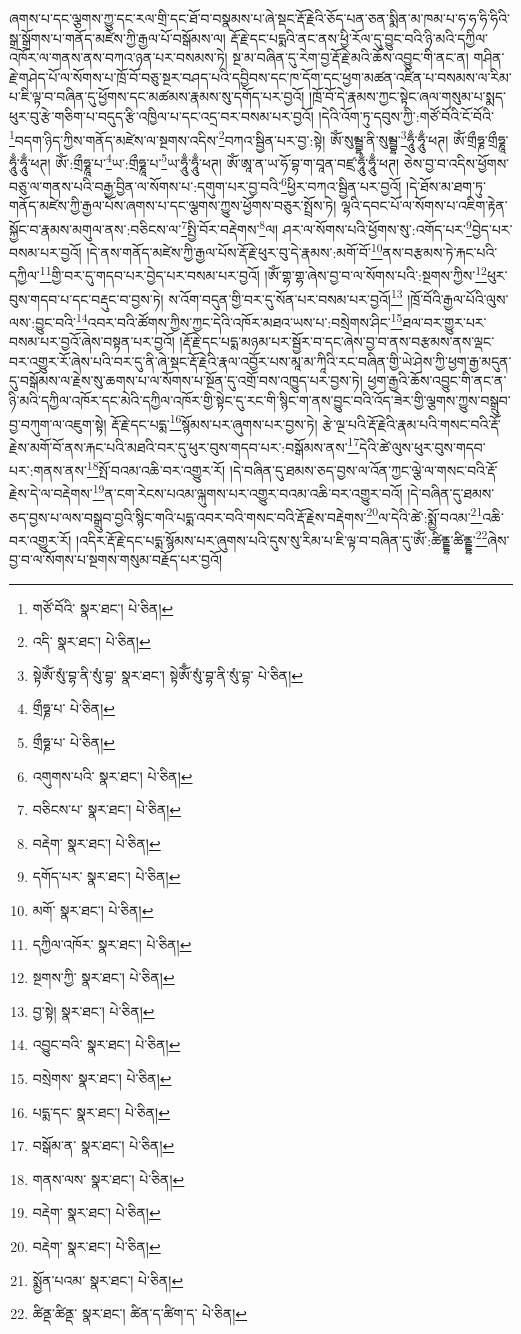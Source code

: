 ཞགས་པ་དང་ལྕགས་ཀྱུ་དང་རལ་གྲི་དང་ཐོ་བ་བསྣམས་པ་ཞེ་སྡང་རྡོ་རྗེའི་ཅོད་པན་ཅན་སྨིན་མ་ཁམ་པ་ཧ་ཧ་ཧི་ཧིའི་སྒྲ་སྒྲོགས་པ་གནོད་མཛེས་ཀྱི་རྒྱལ་པོ་བསྒོམས་ལ། རྡོ་རྗེ་དང་པདྨའི་ནང་ནས་ཕྱི་རོལ་དུ་བྱུང་བའི་ཉི་མའི་དཀྱིལ་འཁོར་ལ་གནས་ནས་བཀའ་ཉན་པར་བསམས་ཏེ། སྔ་མ་བཞིན་དུ་རེག་བྱ་རྡོ་རྗེ་མའི་ཆོས་འབྱུང་གི་ནང་ན། གཤིན་རྗེ་གཤེད་པོ་ལ་སོགས་པ་ཁྲོ་བོ་བཅུ་སྔར་བཤད་པའི་དབྱིབས་དང་ཁ་དོག་དང་ཕྱག་མཚན་འཛིན་པ་བསམས་ལ་རིམ་པ་ཇི་ལྟ་བ་བཞིན་དུ་ཕྱོགས་དང་མཚམས་རྣམས་སུ་དགོད་པར་བྱའོ། །ཁྲོ་བོ་དེ་རྣམས་ཀྱང་སྟེང་ཞལ་གསུམ་པ་སྨད་ཕུར་བུ་རྩེ་གཅིག་པ་བདུད་རྩི་འཁྱིལ་པ་དང་འདྲ་བར་བསམ་པར་བྱའོ། །དེའི་འོག་ཏུ་དབུས་ཀྱི་:གཙོ་བོའི་ངོ་བོའི་\footnote{གཙོ་བོའི་  སྣར་ཐང་།  པེ་ཅིན། }བདག་ཉིད་ཀྱིས་གནོད་མཛེས་ལ་སྔགས་འདིས་\footnote{འདི་  སྣར་ཐང་།  པེ་ཅིན། }བཀའ་སྦྱིན་པར་བྱ་:སྟེ། ཨོཾ་སུམྦྷ་ནི་སུམྦྷ་\footnote{སྟེཨོཾ་སུཾ་བྷ་ནི་སུཾ་བྷ་  སྣར་ཐང་། སྟེཨོྃ་སུཾ་བྷ་ནི་སུཾ་བྷ་  པེ་ཅིན། }ཧཱུྃ་ཧཱུྃ་ཕཊ། ཨོཾ་གྲྀཧྞ་གྲྀཧྞཱ་ཧཱུྃ་ཧཱུྃ་ཕཊ། ཨོཾ་:གྲྀཧྞཱ་པ་\footnote{གྲྀཧྞ་པ་  པེ་ཅིན། }ཡ་:གྲྀཧྞཱ་པ་\footnote{གྲྀཧྞ་པ་  པེ་ཅིན། }ཡ་ཧཱུྃ་ཧཱུྃ་ཕཊ། ཨོཾ་ཨཱ་ན་ཡ་ཧོ་བྷ་ག་བཱན་བཛྲ་ཧཱུྃ་ཧཱུྃ་ཕཊ། ཅེས་བྱ་བ་འདིས་ཕྱོགས་བཅུ་ལ་གནས་པའི་བརྒྱ་བྱིན་ལ་སོགས་པ་:དགུག་པར་བྱ་བའི་\footnote{འགུགས་པའི་  སྣར་ཐང་།  པེ་ཅིན། }ཕྱིར་བཀའ་སྦྱིན་པར་བྱའོ། །དེ་ཐོས་མ་ཐག་ཏུ་གནོད་མཛེས་ཀྱི་རྒྱལ་པོས་ཞགས་པ་དང་ལྕགས་ཀྱུས་ཕྱོགས་བཅུར་སྤྲོས་ཏེ། ལྷའི་དབང་པོ་ལ་སོགས་པ་འཇིག་རྟེན་སྐྱོང་བ་རྣམས་མགུལ་ནས་:བཅིངས་ལ་\footnote{བཅིངས་པ་  སྣར་ཐང་།  པེ་ཅིན། }སྤྱི་བོར་བརྡེགས་\footnote{བརྡེག་  སྣར་ཐང་།  པེ་ཅིན། }ལ། ཤར་ལ་སོགས་པའི་ཕྱོགས་སུ་:འགོད་པར་\footnote{དགོད་པར་  སྣར་ཐང་།  པེ་ཅིན། }བྱེད་པར་བསམ་པར་བྱའོ། །དེ་ནས་གནོད་མཛེས་ཀྱི་རྒྱལ་པོས་རྡོ་རྗེ་ཕུར་བུ་དེ་རྣམས་:མགོ་བོ་\footnote{མགོ་  སྣར་ཐང་།  པེ་ཅིན། }ནས་བརྩམས་ཏེ་རྐང་པའི་དཀྱིལ་\footnote{དཀྱིལ་འཁོར་  སྣར་ཐང་།  པེ་ཅིན། }གྱི་བར་དུ་གདབ་པར་བྱེད་པར་བསམ་པར་བྱའོ། །ཨོཾ་གྷ་གྷ་ཞེས་བྱ་བ་ལ་སོགས་པའི་:སྔགས་ཀྱིས་\footnote{སྔགས་ཀྱི་  སྣར་ཐང་།  པེ་ཅིན། }ཕུར་བུས་གདབ་པ་དང་བརྡུང་བ་བྱས་ཏེ། ས་འོག་བདུན་གྱི་བར་དུ་སོན་པར་བསམ་པར་བྱའོ།\footnote{བྱ་སྟེ།  སྣར་ཐང་།  པེ་ཅིན། } །ཁྲོ་བོའི་རྒྱལ་པོའི་ལུས་ལས་:བྱུང་བའི་\footnote{འབྱུང་བའི་  སྣར་ཐང་།  པེ་ཅིན། }འབར་བའི་ཚོགས་ཀྱིས་ཀྱང་དེའི་འཁོར་མཐའ་ཡས་པ་:བསྲེགས་ཤིང་\footnote{བསྲེགས་  སྣར་ཐང་།  པེ་ཅིན། }ཐལ་བར་གྱུར་པར་བསམ་པར་བྱའོ་ཞེས་བསྟན་པར་བྱའོ། །རྡོ་རྗེ་དང་པདྨ་མཉམ་པར་སྦྱོར་བ་དང་ཞེས་བྱ་བ་ནས་བརྩམས་ནས་ལྡང་བར་འགྱུར་རོ་ཞེས་པའི་བར་དུ་ནི་ཞེ་སྡང་རྡོ་རྗེའི་རྣལ་འབྱོར་པས་མཱ་མ་ཀཱིའི་རང་བཞིན་གྱི་ཡེ་ཤེས་ཀྱི་ཕྱག་རྒྱ་མདུན་དུ་བསྒོམས་ལ་རྗེས་སུ་ཆགས་པ་ལ་སོགས་པ་སྔོན་དུ་འགྲོ་བས་འཁྱུད་པར་བྱས་ཏེ། ཕྱག་རྒྱའི་ཆོས་འབྱུང་གི་ནང་ན་ཉི་མའི་དཀྱིལ་འཁོར་དང་མེའི་དཀྱིལ་འཁོར་གྱི་སྟེང་དུ་རང་གི་སྙིང་ག་ནས་བྱུང་བའི་འོད་ཟེར་གྱི་ལྕགས་ཀྱུས་བསྒྲུབ་བྱ་བཀུག་ལ་འཇུག་སྟེ། རྡོ་རྗེ་དང་པདྨ་\footnote{པདྨ་དང་  སྣར་ཐང་།  པེ་ཅིན། }སྙོམས་པར་ཞུགས་པར་བྱས་ཏེ། རྩེ་ལྔ་པའི་རྡོ་རྗེའི་རྣམ་པའི་གསང་བའི་རྡོ་རྗེས་མགོ་བོ་ནས་རྐང་པའི་མཐའི་བར་དུ་ཕུར་བུས་གདབ་པར་:བསྒོམས་ནས་\footnote{བསྒོམ་ན་  སྣར་ཐང་།  པེ་ཅིན། }དེའི་ཚེ་ལུས་ཕུར་བུས་གདབ་པར་:གནས་ནས་\footnote{གནས་ལས་  སྣར་ཐང་།  པེ་ཅིན། }སྤོ་བའམ་འཆི་བར་འགྱུར་རོ། །དེ་བཞིན་དུ་ཐམས་ཅད་བྱས་ལ་འོན་ཀྱང་ལྕེ་ལ་གསང་བའི་རྡོ་རྗེས་དེ་ལ་བརྡེགས་\footnote{བརྡེག་  སྣར་ཐང་།  པེ་ཅིན། }ན་ངག་རེངས་པའམ་ལྐུགས་པར་འགྱུར་བའམ་འཆི་བར་འགྱུར་བའོ། །དེ་བཞིན་དུ་ཐམས་ཅད་བྱས་པ་ལས་བསྒྲུབ་བྱའི་སྙིང་གའི་པདྨ་འབར་བའི་གསང་བའི་རྡོ་རྗེས་བརྡེགས་\footnote{བརྡེག་  སྣར་ཐང་།  པེ་ཅིན། }ལ་དེའི་ཚེ་:སྨྱོ་བའམ་\footnote{སྨྱོན་པའམ་  སྣར་ཐང་།  པེ་ཅིན། }འཆི་བར་འགྱུར་རོ། །འདིར་རྡོ་རྗེ་དང་པདྨ་སྙོམས་པར་ཞུགས་པའི་དུས་སུ་རིམ་པ་ཇི་ལྟ་བ་བཞིན་དུ་ཨོཾ་:ཚིནྡྷ་ཚིནྡྷ་\footnote{ཚིནྡ་ཚིནྡ་  སྣར་ཐང་། ཚིན་ད་ཚིག་ད་  པེ་ཅིན། }ཞེས་བྱ་བ་ལ་སོགས་པ་སྔགས་གསུམ་བརྗོད་པར་བྱའོ། 